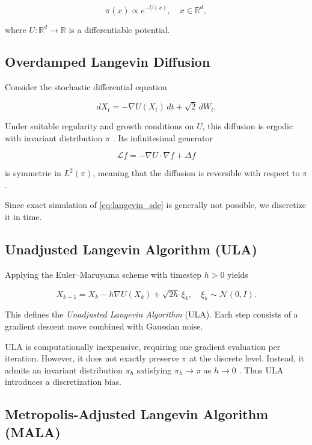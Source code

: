 \documentclass[11pt, twoside]{report}
\begin{document}
\[
\pi(x) \propto e^{-U(x)}, 
\quad x \in \mathbb{R}^d,
\]

where $U : \mathbb{R}^d \to \mathbb{R}$ is a differentiable potential.

\subsection{Overdamped Langevin Diffusion}

Consider the stochastic differential equation

\begin{equation}
dX_t = -\nabla U(X_t)\,dt + \sqrt{2}\,dW_t.
\label{eq:langevin_sde}
\end{equation}

Under suitable regularity and growth conditions on $U$, this diffusion is ergodic 
with invariant distribution $\pi$ \cite{pavliotis_book}. Its infinitesimal generator

\[
\mathcal{L} f = -\nabla U \cdot \nabla f + \Delta f
\]

is symmetric in $L^2(\pi)$, meaning that the diffusion is reversible with respect to $\pi$.

Since exact simulation of \eqref{eq:langevin_sde} is generally not possible, 
we discretize it in time.

\subsection{Unadjusted Langevin Algorithm (ULA)}

Applying the Euler--Maruyama scheme with timestep $h > 0$ yields

\begin{equation}
X_{k+1}
=
X_k
-
h \nabla U(X_k)
+
\sqrt{2h}\,\xi_k,
\quad
\xi_k \sim \mathcal{N}(0,I).
\label{eq:ula}
\end{equation}

This defines the \emph{Unadjusted Langevin Algorithm} (ULA). 
Each step consists of a gradient descent move combined with Gaussian noise.

ULA is computationally inexpensive, requiring one gradient evaluation per iteration. 
However, it does not exactly preserve $\pi$ at the discrete level. Instead, 
it admits an invariant distribution $\pi_h$ satisfying $\pi_h \to \pi$ as $h \to 0$ \cite{wibisono}. 
Thus ULA introduces a discretization bias.

\subsection{Metropolis-Adjusted Langevin Algorithm (MALA)}
\end{document}
